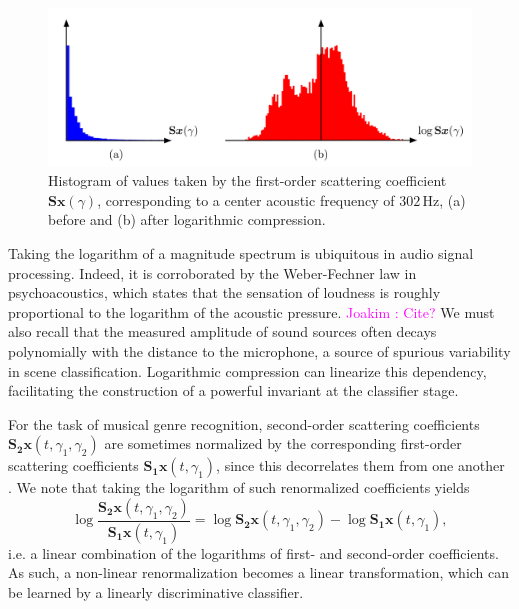 \documentclass[journal]{IEEEtran}
\makeatletter
\newcommand*{\ie}{i.e.\@\xspace}
\newcommand{\ja}[1]{\textcolor{magenta}{Joakim : #1}}
\makeatother
\begin{document}
\begin{figure}
\begin{center}
\includegraphics[width=\columnwidth]{compression.png}
\caption{
\label{fig:histograms}
Histogram of values taken by the first-order scattering coefficient $\mathbf{S}\boldsymbol{x}(\gamma)$, corresponding to a center acoustic frequency of $302\,\mathrm{Hz}$,
(a) before and (b) after logarithmic compression.}
\end{center}
\end{figure}


Taking the logarithm of a magnitude spectrum is ubiquitous in audio signal processing.
Indeed, it is corroborated by the Weber-Fechner law in psychoacoustics, which states that the sensation of loudness is roughly proportional to the logarithm of the acoustic pressure. \ja{Cite?}
We must also recall that the measured amplitude of sound sources often decays polynomially with the distance to the microphone, a source of spurious variability in scene classification.
Logarithmic compression can linearize this dependency, facilitating the construction of a powerful invariant at the classifier stage.

For the task of musical genre recognition, second-order scattering coefficients $\mathbf{S_2}\boldsymbol{x}(t,\gamma_1,\gamma_2)$ are sometimes normalized by the corresponding first-order scattering coefficients $\mathbf{S_1}\boldsymbol{x}(t,\gamma_1)$, since this decorrelates them from one another \cite{Anden2014}.
We note that taking the logarithm of such renormalized coefficients yields
\begin{equation}
\log \dfrac{\mathbf{S_2}\boldsymbol{x}(t,\gamma_1,\gamma_2)}{\mathbf{S_1}\boldsymbol{x}(t,\gamma_1)} =
\log \mathbf{S_2}\boldsymbol{x}(t, \gamma_1, \gamma_2) -
\log \mathbf{S_1}\boldsymbol{x}(t, \gamma_1),
\end{equation}
\ie a linear combination of the logarithms of first- and second-order coefficients.
As such, a non-linear renormalization becomes a linear transformation, which can be learned by a linearly discriminative classifier.
\end{document}
